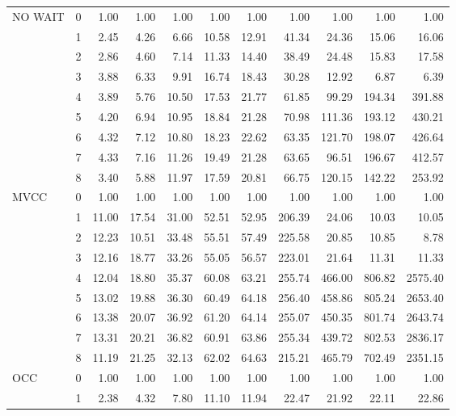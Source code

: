 \begin{tabular}{llrrrrrrrrr}
NO WAIT & 0 &  1.00 &  1.00 &  1.00 &  1.00 &  1.00 &   1.00 &   1.00 &   1.00 &    1.00 \\
       & 1 &  2.45 &  4.26 &  6.66 & 10.58 & 12.91 &  41.34 &  24.36 &  15.06 &   16.06 \\
       & 2 &  2.86 &  4.60 &  7.14 & 11.33 & 14.40 &  38.49 &  24.48 &  15.83 &   17.58 \\
       & 3 &  3.88 &  6.33 &  9.91 & 16.74 & 18.43 &  30.28 &  12.92 &   6.87 &    6.39 \\
       & 4 &  3.89 &  5.76 & 10.50 & 17.53 & 21.77 &  61.85 &  99.29 & 194.34 &  391.88 \\
       & 5 &  4.20 &  6.94 & 10.95 & 18.84 & 21.28 &  70.98 & 111.36 & 193.12 &  430.21 \\
       & 6 &  4.32 &  7.12 & 10.80 & 18.23 & 22.62 &  63.35 & 121.70 & 198.07 &  426.64 \\
       & 7 &  4.33 &  7.16 & 11.26 & 19.49 & 21.28 &  63.65 &  96.51 & 196.67 &  412.57 \\
       & 8 &  3.40 &  5.88 & 11.97 & 17.59 & 20.81 &  66.75 & 120.15 & 142.22 &  253.92 \\
MVCC & 0 &  1.00 &  1.00 &  1.00 &  1.00 &  1.00 &   1.00 &   1.00 &   1.00 &    1.00 \\
       & 1 & 11.00 & 17.54 & 31.00 & 52.51 & 52.95 & 206.39 &  24.06 &  10.03 &   10.05 \\
       & 2 & 12.23 & 10.51 & 33.48 & 55.51 & 57.49 & 225.58 &  20.85 &  10.85 &    8.78 \\
       & 3 & 12.16 & 18.77 & 33.26 & 55.05 & 56.57 & 223.01 &  21.64 &  11.31 &   11.33 \\
       & 4 & 12.04 & 18.80 & 35.37 & 60.08 & 63.21 & 255.74 & 466.00 & 806.82 & 2575.40 \\
       & 5 & 13.02 & 19.88 & 36.30 & 60.49 & 64.18 & 256.40 & 458.86 & 805.24 & 2653.40 \\
       & 6 & 13.38 & 20.07 & 36.92 & 61.20 & 64.14 & 255.07 & 450.35 & 801.74 & 2643.74 \\
       & 7 & 13.31 & 20.21 & 36.82 & 60.91 & 63.86 & 255.34 & 439.72 & 802.53 & 2836.17 \\
       & 8 & 11.19 & 21.25 & 32.13 & 62.02 & 64.63 & 215.21 & 465.79 & 702.49 & 2351.15 \\
OCC & 0 &  1.00 &  1.00 &  1.00 &  1.00 &  1.00 &   1.00 &   1.00 &   1.00 &    1.00 \\
       & 1 &  2.38 &  4.32 &  7.80 & 11.10 & 11.94 &  22.47 &  21.92 &  22.11 &   22.86 \\

\end{tabular}
